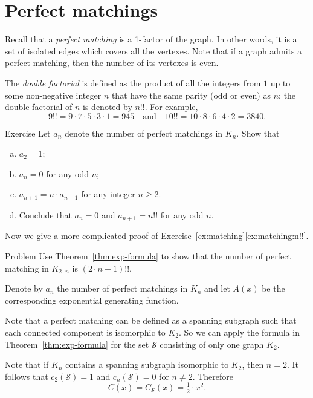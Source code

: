 \section*{Perfect matchings}

Recall that a \emph{perfect matching} is a 1-factor of the graph. 
In other words, it is a set of isolated edges which covers all the vertexes.
Note that if a graph admits a perfect matching, then the number of its vertexes is even.

The \emph{double factorial} is defined as the product of all the integers from $1$ up to some non-negative integer $n$ that have the same parity (odd or even) as $n$;
the double factorial of $n$ is denoted by $n!!$.
For example, 
\[9!! = 9\cdot 7 \cdot 5 \cdot 3 \cdot  1 = 945
\quad\text{and}\quad
10!!=10\cdot8\cdot6\cdot4\cdot2=3840.
\]

\begin{thm}{Exercise}\label{ex:matching}
Let $a_n$ denote the number of perfect matchings in $K_n$.
Show that 
\begin{enumerate}[(a)]
 \item $a_2=1$;
 \item $a_n=0$ for any odd $n$;
 \item\label{ex:matching:recursion} $a_{n+1}=n\cdot a_{n-1}$ for any integer $n\ge 2$.
 \item\label{ex:matching:n!!} 
 Conclude that $a_n=0$ and $a_{n+1}=n!!$ for any odd $n$.
\end{enumerate}

\end{thm}

Now we give a more complicated proof of Exercise~\ref{ex:matching}\ref{ex:matching:n!!}.

\begin{thm}{Problem}
Use Theorem~\ref{thm:exp-formula} to show that the number of perfect matching in $K_{2\cdot n}$ is $(2\cdot n-1)!!$.
\end{thm}

Denote by $a_n$ the number of perfect matchings in $K_{n}$ and let $A(x)$ be the corresponding exponential generating function.

Note that a perfect matching can be defined as a spanning subgraph such that each connected component is isomorphic to $K_2$.
So we can apply the formula in Theorem~\ref{thm:exp-formula} for the set $\mathcal{S}$ consisting of only one graph $K_2$.

Note that if $K_n$ contains a spanning subgraph isomorphic to $K_2$,
then $n=2$.
It follows that $c_2(\mathcal{S})=1$ and $c_n(\mathcal{S})=0$ for $n\ne 2$.
Therefore 
\[C(x)=C_{\mathcal{S}}(x)=\tfrac12\cdot x^2.\]

